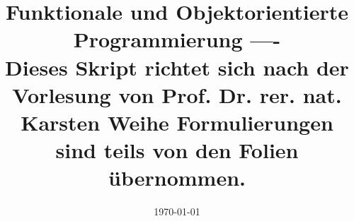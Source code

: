 \documentclass[a4paper,12pt,liststotoc, parskip=half]{scrreprt}
\begin{document}
    \pagestyle{fancy}

    \title{
      Funktionale und Objektorientierte Programmierung
      \large ---- \\Dieses Skript richtet sich nach der Vorlesung von Prof. Dr. rer. nat. Karsten Weihe Formulierungen sind teils von den Folien übernommen.}
		\author{}
    \date{\today}
    \maketitle

    \lhead{}
    \chead{\leftmark}
    \rhead{}

    \cfoot{\thepage}
    \rfoot{ %
    \date{\today} }

    \begingroup
      \renewcommand*{\chapterpagestyle}{empty}

      \pagestyle{empty}
      \tableofcontents
    \endgroup


    \clearpage

    
    
    
    
		
    \appendix

    
\end{document}
